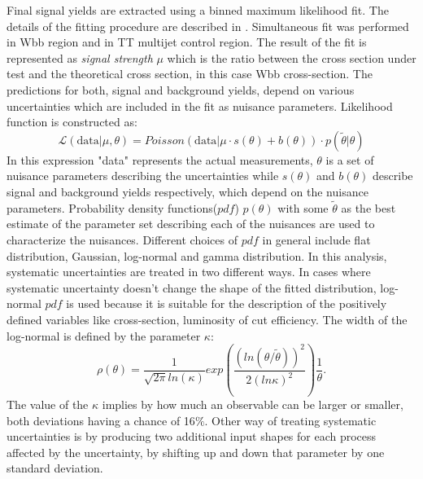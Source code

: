 Final signal yields are extracted using a binned maximum likelihood fit. The details of the fitting procedure are described in \cite{ATL-PHYS-PUB-2011-011}. Simultaneous fit was performed in Wbb region and in TT multijet control region. The result of the fit is represented as \textit{signal strength} $\mu$ which is the ratio between the cross section under test and the theoretical cross section, in this case Wbb cross-section. The predictions for both, signal and background yields, depend on various uncertainties which are included in the fit as nuisance parameters. Likelihood function is constructed as:
\begin{equation}
\mathcal{L}(\mathrm{data}|\mu,\theta) = Poisson(\mathrm{data}|\mu \cdot s(\theta)+b(\theta))\cdot p(\widetilde{\theta} | \theta) 
\end{equation} 
In this expression "data" represents the actual measurements, $\theta$ is a set of nuisance parameters describing the uncertainties while $s(\theta)$ and $b(\theta)$ describe signal and background yields respectively, which depend on the nuisance parameters. Probability density functions($pdf$) $p(\theta)$ with some $\widetilde{\theta}$ as the best estimate of the parameter set describing each of the nuisances are used to characterize the nuisances. Different choices of $pdf$ in general include flat distribution, Gaussian, log-normal and gamma distribution. In this analysis, systematic uncertainties are treated in two different ways. In cases where systematic uncertainty doesn't change the shape of the fitted distribution, log-normal $pdf$ is used because it is suitable for the description of the positively defined variables like cross-section, luminosity of cut efficiency. The width of the log-normal is defined by the parameter $\kappa$:
\begin{equation}
\rho(\theta) = \frac{1}{\sqrt{2\pi}ln(\kappa)}exp\left(\frac{(ln(\theta/\widetilde{\theta}))^2}{2(ln \kappa)^2}\right)\frac{1}{\theta}.
\end{equation}
The value of the $\kappa$ implies by how much an observable can be larger or smaller, both deviations having a chance of 16$\%$. Other way of treating systematic uncertainties is by producing two additional input shapes for each process affected by the uncertainty, by shifting up and down that parameter by one standard deviation. 
